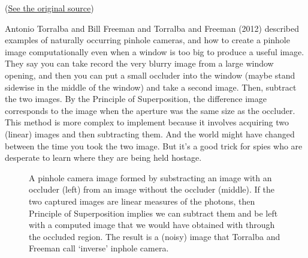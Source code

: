 \documentclass[
  letterpaper,
]{book}
\begin{document}
\begin{tcolorbox}
\begin{figure}[H]
\end{figure}%

(\href{https://x.com/Rainmaker1973/status/1830854129155031206}{See the
original source})

Antonio Torralba and Bill Freeman and Torralba and Freeman (2012)
described examples of naturally occurring pinhole cameras, and how to
create a pinhole image computationally even when a window is too big to
produce a useful image. They say you can take record the very blurry
image from a large window opening, and then you can put a small occluder
into the window (maybe stand sidewise in the middle of the window) and
take a second image. Then, subtract the two images. By the Principle of
Superposition, the difference image corresponds to the image when the
aperture was the same size as the occluder. This method is more complex
to implement because it involves acquiring two (linear) images and then
subtracting them. And the world might have changed between the time you
took the two image. But it's a good trick for spies who are desperate to
learn where they are being held hostage.

\begin{figure}[H]


\caption{\label{fig-torralba}A pinhole camera image formed by
substracting an image with an occluder (left) from an image without the
occluder (middle). If the two captured images are linear measures of the
photons, then Principle of Superposition implies we can subtract them
and be left with a computed image that we would have obtained with
through the occluded region. The result is a (noisy) image that Torralba
and Freeman call `inverse' inphole camera.}

\end{figure}%

\end{tcolorbox}
\end{document}
